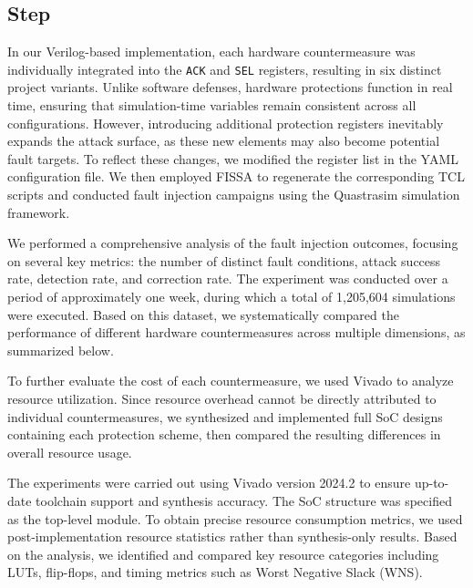 \subsection{Step}
In our Verilog-based implementation, each hardware countermeasure was individually integrated into the \texttt{ACK} and \texttt{SEL} registers, resulting in six distinct project variants. Unlike software defenses, hardware protections function in real time, ensuring that simulation-time variables remain consistent across all configurations. However, introducing additional protection registers inevitably expands the attack surface, as these new elements may also become potential fault targets. To reflect these changes, we modified the register list in the YAML configuration file. We then employed FISSA to regenerate the corresponding TCL scripts and conducted fault injection campaigns using the Quastrasim simulation framework.

We performed a comprehensive analysis of the fault injection outcomes, focusing on several key metrics: the number of distinct fault conditions, attack success rate, detection rate, and correction rate. The experiment was conducted over a period of approximately one week, during which a total of 1,205,604 simulations were executed. Based on this dataset, we systematically compared the performance of different hardware countermeasures across multiple dimensions, as summarized below.

To further evaluate the cost of each countermeasure, we used Vivado to analyze resource utilization. Since resource overhead cannot be directly attributed to individual countermeasures, we synthesized and implemented full SoC designs containing each protection scheme, then compared the resulting differences in overall resource usage.

The experiments were carried out using Vivado version 2024.2 to ensure up-to-date toolchain support and synthesis accuracy. The SoC structure was specified as the top-level module. To obtain precise resource consumption metrics, we used post-implementation resource statistics rather than synthesis-only results. Based on the analysis, we identified and compared key resource categories including LUTs, flip-flops, and timing metrics such as Worst Negative Slack (WNS).

